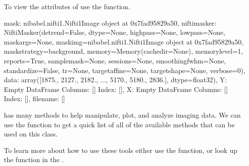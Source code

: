 \documentclass[letterpaper,10pt,english]{sphinxmanual}
\begin{document}
To view the attributes of  use the  function.

\begin{sphinxVerbatim}[commandchars=\\\{\}]
\end{sphinxVerbatim}

\begin{sphinxVerbatim}[commandchars=\\\{\}]
\PYGZob{}\PYGZsq{}mask\PYGZsq{}: \PYGZlt{}nibabel.nifti1.Nifti1Image object at 0x7fad95829a50\PYGZgt{}, \PYGZsq{}nifti\PYGZus{}masker\PYGZsq{}: NiftiMasker(detrend=False, dtype=None, high\PYGZus{}pass=None, low\PYGZus{}pass=None,
            mask\PYGZus{}args=None,
            mask\PYGZus{}img=\PYGZlt{}nibabel.nifti1.Nifti1Image object at 0x7fad95829a50\PYGZgt{},
            mask\PYGZus{}strategy=\PYGZsq{}background\PYGZsq{}, memory=Memory(cachedir=None),
            memory\PYGZus{}level=1, reports=True, sample\PYGZus{}mask=None, sessions=None,
            smoothing\PYGZus{}fwhm=None, standardize=False, t\PYGZus{}r=None,
            target\PYGZus{}affine=None, target\PYGZus{}shape=None, verbose=0), \PYGZsq{}data\PYGZsq{}: array([1875., 2127., 2182., ..., 5170., 5180., 2836.], dtype=float32), \PYGZsq{}Y\PYGZsq{}: Empty DataFrame
Columns: []
Index: [], \PYGZsq{}X\PYGZsq{}: Empty DataFrame
Columns: []
Index: [], \PYGZsq{}file\PYGZus{}name\PYGZsq{}: []\PYGZcb{}
\end{sphinxVerbatim}

 has many methods to help manipulate, plot, and analyze imaging data. We can use the  function to get a quick list of all of the available methods that can be used on this class.

To learn more about how to use these tools either use the  function, or look up the function in the .

\begin{sphinxVerbatim}[commandchars=\\\{\}]
\end{sphinxVerbatim}
\end{document}
